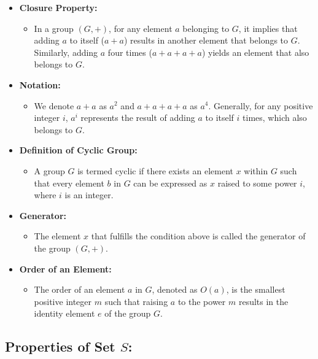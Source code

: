\documentclass[11pt]{article}
\begin{document}
\begin{itemize}
    \item \textbf{Closure Property:}
    \begin{itemize}
        \item In a group $(G, +)$, for any element $a$ belonging to $G$, it implies that adding $a$ to itself ($a + a$) results in another element that belongs to $G$. Similarly, adding $a$ four times ($a + a + a + a$) yields an element that also belongs to $G$.
    \end{itemize}
    
    \item \textbf{Notation:}
    \begin{itemize}
        \item We denote $a + a$ as $a^2$ and $a + a + a + a$ as $a^4$. Generally, for any positive integer $i$, $a^i$ represents the result of adding $a$ to itself $i$ times, which also belongs to $G$.
    \end{itemize}
    
    \item \textbf{Definition of Cyclic Group:}
    \begin{itemize}
        \item A group $G$ is termed cyclic if there exists an element $x$ within $G$ such that every element $b$ in $G$ can be expressed as $x$ raised to some power $i$, where $i$ is an integer.
    \end{itemize}
    
    \item \textbf{Generator:}
    \begin{itemize}
        \item The element $x$ that fulfills the condition above is called the generator of the group $(G, +)$.
    \end{itemize}
    
    \item \textbf{Order of an Element:}
    \begin{itemize}
        \item The order of an element $a$ in $G$, denoted as $O(a)$, is the smallest positive integer $m$ such that raising $a$ to the power $m$ results in the identity element $e$ of the group $G$.
    \end{itemize}
\end{itemize}



\subsection{Properties of Set $S$:}
\end{document}
